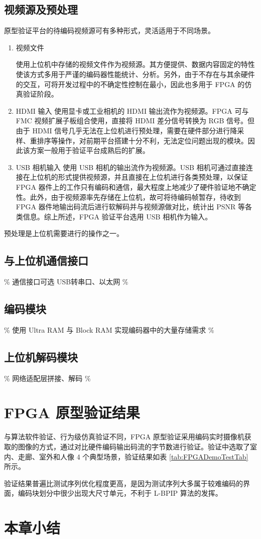 \subsection{视频源及预处理}
原型验证平台的待编码视频源可有多种形式，灵活适用于不同场景。
\begin{enumerate}
    \item 视频文件
    
    使用上位机中存储的视频文件作为视频源。其方便提供、数据内容固定的特性使该方式多用于严谨的编码器性能统计、分析。另外，由于不存在与其余硬件的交互，可将开发过程中的不确定性控制在最小，因此也多用于 FPGA 的仿真验证阶段。

    \item HDMI 输入
    使用显卡或工业相机的 HDMI 输出流作为视频源。FPGA 可与 FMC 视频扩展子板组合使用，直接将 HDMI 差分信号转换为 RGB 信号。但由于 HDMI 信号几乎无法在上位机进行预处理，需要在硬件部分进行降采样、重排序等操作，对前期平台搭建十分不利，无法定位问题出现的模块。因此该方案一般用于验证平台成熟后的扩展。

    \item USB 相机输入
    使用 USB 相机的输出流作为视频源。USB 相机可通过直接连接在上位机的形式提供视频源，并且直接在上位机进行各类预处理，以保证 FPGA 器件上的工作只有编码和通信，最大程度上地减少了硬件验证地不确定性。此外，由于视频源率先存储在上位机，故可将待编码帧暂存，待收到 FPGA 器件地输出码流后进行软解码并与视频源做对比，统计出 PSNR 等各类信息。综上所述，FPGA 验证平台选用 USB 相机作为输入。
\end{enumerate}
预处理是上位机需要进行的操作之一。

\subsection{与上位机通信接口}
\% 通信接口可选 USB转串口、以太网 \%

\subsection{编码模块}
\% 使用 Ultra RAM 与 Block RAM 实现编码器中的大量存储需求 \%

\subsection{上位机解码模块}
\% 网络适配层拼接、解码 \%

\section{FPGA 原型验证结果}
与算法软件验证、行为级仿真验证不同，FPGA 原型验证采用编码实时摄像机获取的图像的方式，通过对比硬件编码输出码流的字节数进行验证。验证中选取了室内、走廊、室外和人像 4 个典型场景，验证结果如表 \ref{tab:FPGADemoTestTab} 所示。


验证结果普遍比测试序列优化程度更高，是因为测试序列大多属于较难编码的界面，编码块划分中很少出现大尺寸单元，不利于 L-BPIP 算法的发挥。

\section{本章小结}